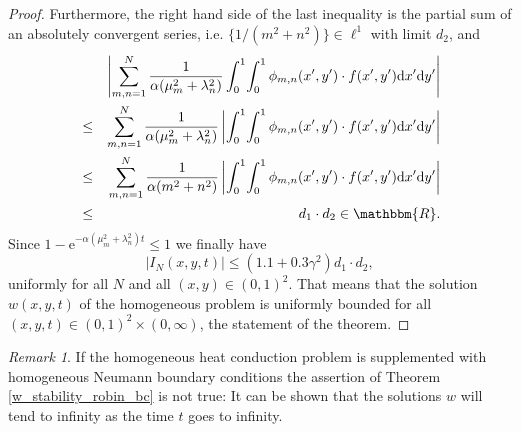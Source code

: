 \documentclass[a4paper,11pt]{article}
\theoremstyle{plain} %
\theoremstyle{definition} %
\theoremstyle{remark} %
\newtheorem{remark}{Remark}[section]
\theoremstyle{remark}
\begin{document}
\begin{proof}
Furthermore, the right hand side of the last inequality is the partial sum of an absolutely convergent series, i.e. $ \{ 1 / ( m^2 +n^2 ) \} \in \ell^1 $ with limit $d_2 $, and
\begin{eqnarray*}
& & \left| \sum_{m,n =1 }^N \frac{1 }{\alpha (\mu^2_m + \lambda^2_n)} \int_0^1\!\int_0^1 \phi_{m,n} (x', y' ) \cdot  f (x',y')  \mathrm{d}x' \mathrm{d}y' \right| \\
 & \leq & \sum_{m,n =1 }^N \frac{1 }{\alpha (\mu^2_m + \lambda^2_n)} \left| \int_0^1\!\int_0^1  \phi_{m,n} (x', y' ) \cdot  f (x',y')  \mathrm{d}x' \mathrm{d}y' \right| \\
& \leq & \sum_{m,n =1 }^N \frac{1 }{\alpha (m^2 + n^2)} \left| \int_0^1\!\int_0^1  \phi_{m,n} (x', y' ) \cdot  f (x',y')  \mathrm{d}x' \mathrm{d}y' \right| \\
& \leq & d_1\cdot d_2 \in \mathbbm{R} .
\end{eqnarray*}
Since $ 1 - \mathrm{e}^{-\alpha (\mu^2_m + \lambda^2_n) t } \leq 1 $ we finally have
\begin{equation*}
\left| I_N (x,y, t)\right| \leq \left( 1.1 + 0.3\gamma^2 \right) d_1\cdot d_2 ,
\end{equation*}
uniformly for all $N$ and all $(x,y) \in (0,1)^2 $.
That means that the solution $w (x,y, t) $ of the homogeneous problem is uniformly bounded for all $(x,y, t) \in (0,1)^2 \times (0,\infty) $, the statement of the theorem.
\end{proof}

\begin{remark}
If the homogeneous heat conduction problem is supplemented with homogeneous Neumann boundary conditions the assertion of Theorem \ref{w_stability_robin_bc} is not true: It can be shown that the solutions $w$ will tend to infinity as the time $t$ goes to infinity.
\end{remark}
\end{document}
